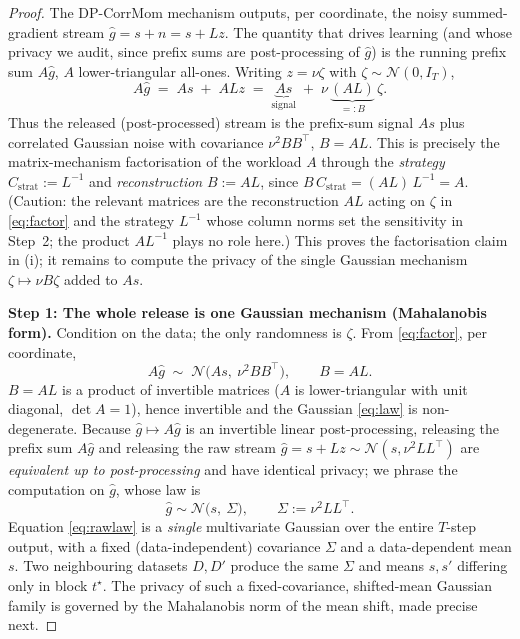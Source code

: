 \begin{proof}
The DP-CorrMom mechanism outputs, per coordinate, the noisy summed-gradient stream
$\hat g=s+n=s+Lz$. The quantity that drives learning (and whose privacy we audit, since prefix sums
are post-processing of $\hat g$) is the running prefix sum $A\hat g$, $A$ lower-triangular all-ones.
Writing $z=\nu\zeta$ with $\zeta\sim\mathcal N(0,I_T)$,
\begin{equation}
A\hat g \;=\; A s \;+\; A L z \;=\; \underbrace{A s}_{\text{signal}}
\;+\;\nu\,\underbrace{(AL)}_{=:B}\,\zeta .
\label{eq:factor}
\end{equation}
Thus the released (post-processed) stream is the prefix-sum signal $As$ plus correlated Gaussian noise
with covariance $\nu^2 BB^\top$, $B=AL$. This is precisely the matrix-mechanism factorisation of the
workload $A$ through the \emph{strategy} $C_{\mathrm{strat}}:=L^{-1}$ and \emph{reconstruction}
$B:=AL$, since $B\,C_{\mathrm{strat}}=(AL)\,L^{-1}=A$. (Caution: the relevant matrices are the
reconstruction $AL$ acting on $\zeta$ in \eqref{eq:factor} and the strategy $L^{-1}$ whose column
norms set the sensitivity in Step~2; the product $A L^{-1}$ plays no role here.) This proves the
factorisation claim in (i); it remains to compute the privacy of the single Gaussian mechanism
$\zeta\mapsto \nu B\zeta$ added to $As$.

\medskip
\noindent\textbf{Step 1: The whole release is one Gaussian mechanism (Mahalanobis form).}
Condition on the data; the only randomness is $\zeta$. From \eqref{eq:factor}, per coordinate,
\begin{equation}
A\hat g \;\sim\; \mathcal N\!\big(As,\ \nu^2 B B^\top\big),\qquad B=AL .
\label{eq:law}
\end{equation}
$B=AL$ is a product of invertible matrices ($A$ is lower-triangular with unit diagonal, $\det A=1$),
hence invertible and the Gaussian \eqref{eq:law} is non-degenerate. Because $\hat g\mapsto A\hat g$ is
an invertible linear post-processing, releasing the prefix sum $A\hat g$ and releasing the raw stream
$\hat g=s+Lz\sim\mathcal N(s,\nu^2 LL^\top)$ are \emph{equivalent up to post-processing} and have
identical privacy; we phrase the computation on $\hat g$, whose law is
\begin{equation}
\hat g\sim\mathcal N\!\big(s,\ \Sigma\big),\qquad \Sigma:=\nu^2 LL^\top .
\label{eq:rawlaw}
\end{equation}
Equation \eqref{eq:rawlaw} is a \emph{single} multivariate Gaussian over the entire $T$-step output,
with a fixed (data-independent) covariance $\Sigma$ and a data-dependent mean $s$. Two neighbouring
datasets $D,D'$ produce the same $\Sigma$ and means $s,s'$ differing only in block $t^\star$. The
privacy of such a fixed-covariance, shifted-mean Gaussian family is governed by the Mahalanobis norm
of the mean shift, made precise next.


\end{proof}
